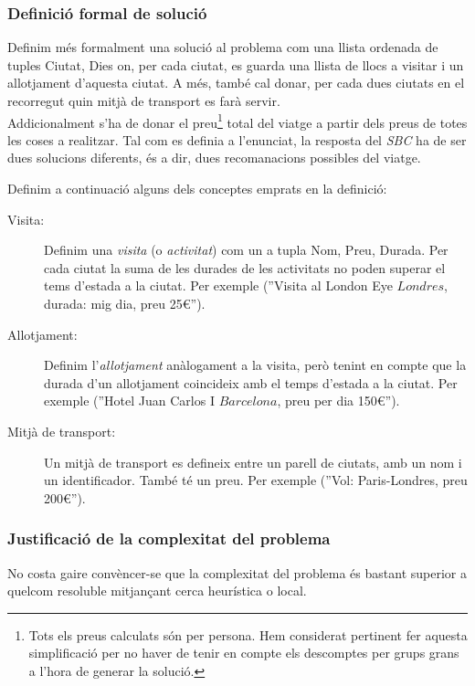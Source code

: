 \documentclass[11pt,a4paper]{article}
\begin{document}
\subsubsection{Definició formal de solució}
\label{sec:solucio_formal}
Definim més formalment una solució al problema com una llista ordenada de tuples \big \langle Ciutat, Dies\big \rangle{} on, per cada ciutat, es guarda una llista de llocs a visitar i un allotjament d'aquesta ciutat. A més, també cal donar, per cada dues ciutats en el recorregut quin mitjà de transport es farà servir.\\
Addicionalment s'ha de donar el preu\footnote{Tots els preus calculats són per persona. Hem considerat pertinent fer aquesta simplificació per no haver de tenir en compte els descomptes per grups grans a l'hora de generar la solució.} total del viatge a partir dels preus de totes les coses a realitzar. Tal com es definia a l'enunciat, la resposta del \emph{SBC} ha de ser dues solucions diferents, és a dir, dues recomanacions possibles del viatge.

Definim a continuació alguns dels conceptes emprats en la definició:

\begin{description}
\item[Visita:] Definim una \emph{visita} (o \emph{activitat}) com un a tupla \big \langle Nom, Preu, Durada\big \rangle{}. Per cada ciutat la suma de les durades de les activitats no poden superar el tems d'estada a la ciutat. Per exemple (''Visita al London Eye \(Londres\), durada: mig dia, preu 25\euro'').
\item[Allotjament:] Definim l'\emph{allotjament} anàlogament a la visita, però tenint en compte que la durada d'un allotjament coincideix amb el temps d'estada a la ciutat. Per exemple (''Hotel Juan Carlos I \(Barcelona\), preu per dia 150\euro'').
\item[Mitjà de transport:] Un mitjà de transport es defineix entre un parell de ciutats, amb un nom i un identificador. També té un preu. Per exemple (''Vol: Paris-Londres, preu 200\euro'').
\end{description}

\subsubsection{Justificació de la complexitat del problema}
No costa gaire convèncer-se que la complexitat del problema és bastant superior a quelcom resoluble mitjançant cerca heurística o local.
\end{document}

